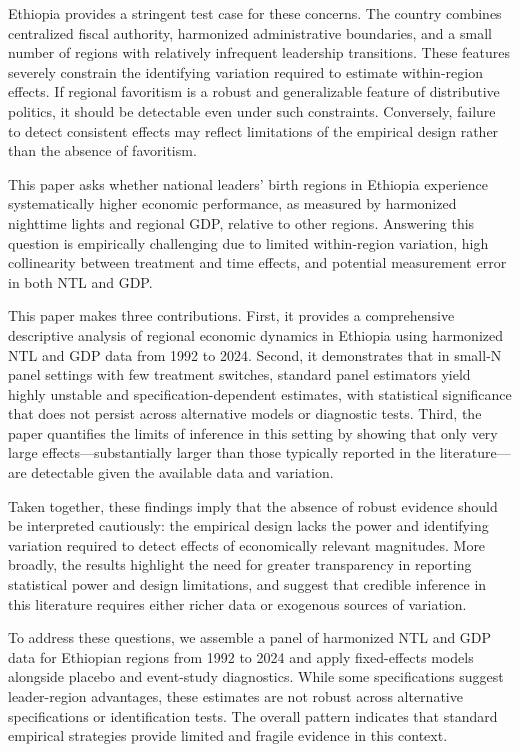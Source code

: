 \documentclass[12pt,a4paper]{article}
\begin{document}
Ethiopia provides a stringent test case for these concerns. The country combines centralized fiscal authority, harmonized administrative boundaries, and a small number of regions with relatively infrequent leadership transitions. These features severely constrain the identifying variation required to estimate within-region effects. If regional favoritism is a robust and generalizable feature of distributive politics, it should be detectable even under such constraints. Conversely, failure to detect consistent effects may reflect limitations of the empirical design rather than the absence of favoritism.

This paper asks whether national leaders’ birth regions in Ethiopia experience systematically higher economic performance, as measured by harmonized nighttime lights and regional GDP, relative to other regions. Answering this question is empirically challenging due to limited within-region variation, high collinearity between treatment and time effects, and potential measurement error in both NTL and GDP.

This paper makes three contributions. First, it provides a comprehensive descriptive analysis of regional economic dynamics in Ethiopia using harmonized NTL and GDP data from 1992 to 2024. Second, it demonstrates that in small-N panel settings with few treatment switches, standard panel estimators yield highly unstable and specification-dependent estimates, with statistical significance that does not persist across alternative models or diagnostic tests. Third, the paper quantifies the limits of inference in this setting by showing that only very large effects—substantially larger than those typically reported in the literature—are detectable given the available data and variation.

Taken together, these findings imply that the absence of robust evidence should be interpreted cautiously: the empirical design lacks the power and identifying variation required to detect effects of economically relevant magnitudes. More broadly, the results highlight the need for greater transparency in reporting statistical power and design limitations, and suggest that credible inference in this literature requires either richer data or exogenous sources of variation.

To address these questions, we assemble a panel of harmonized NTL and GDP data for Ethiopian regions from 1992 to 2024 and apply fixed-effects models alongside placebo and event-study diagnostics. While some specifications suggest leader-region advantages, these estimates are not robust across alternative specifications or identification tests. The overall pattern indicates that standard empirical strategies provide limited and fragile evidence in this context.
\end{document}

